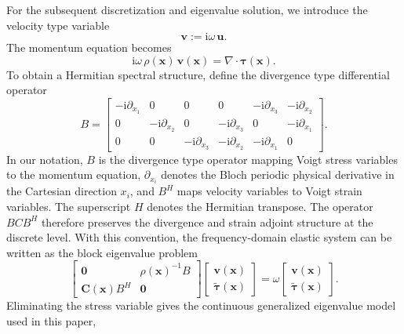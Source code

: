 \documentclass[11pt,oneside]{article}
\numberwithin{equation}{section}
\theoremstyle{plain}
\theoremstyle{remark}
\begin{document}
For the subsequent discretization and eigenvalue solution, we introduce the velocity type variable
\begin{equation}\label{eq:v_def_main}
\bm v:=\mathrm i\omega\,\bm u.
\end{equation}
The momentum equation becomes
\begin{equation}\label{eq:momentum_v_main}
\mathrm i\omega\,\rho(\mathbf x)\,\bm v(\mathbf x)=\nabla\cdot\bm\tau(\mathbf x).
\end{equation}
To obtain a Hermitian spectral structure, define the divergence type differential operator
\begin{equation}\label{eq:B_op_main}
B=
\begin{bmatrix}
-\mathrm{i}\partial_{x_1}&0&0&0&-\mathrm{i}\partial_{x_3}&-\mathrm{i}\partial_{x_2}\\
0&-\mathrm{i}\partial_{x_2}&0&-\mathrm{i}\partial_{x_3}&0&-\mathrm{i}\partial_{x_1}\\
0&0&-\mathrm{i}\partial_{x_3}&-\mathrm{i}\partial_{x_2}&-\mathrm{i}\partial_{x_1}&0
\end{bmatrix}.
\end{equation}
In our notation, \(B\) is the divergence type operator mapping Voigt stress variables to the momentum equation, \(\partial_{x_i}\) denotes the Bloch periodic physical derivative in the Cartesian direction \(x_i\), and \(B^H\) maps velocity variables to Voigt strain variables. The superscript \(H\) denotes the Hermitian transpose. The operator \(BCB^H\) therefore preserves the divergence and strain adjoint structure at the discrete level. With this convention, the frequency-domain elastic system can be written as the block eigenvalue problem
\begin{equation}\label{eq:first_order_eig_block_main}
\left[
\begin{array}{cc}
\mathbf 0 & \rho(\mathbf x)^{-1} B\\
\bm C(\mathbf x) B^H & \mathbf 0
\end{array}
\right]
\left[
\begin{array}{c}
\bm v(\mathbf x)\\
\widetilde{\bm\tau}(\mathbf x)
\end{array}
\right]
=
\omega
\left[
\begin{array}{c}
\bm v(\mathbf x)\\
\widetilde{\bm\tau}(\mathbf x)
\end{array}
\right].
\end{equation}
Eliminating the stress variable gives the continuous generalized eigenvalue model used in this paper,
\end{document}
